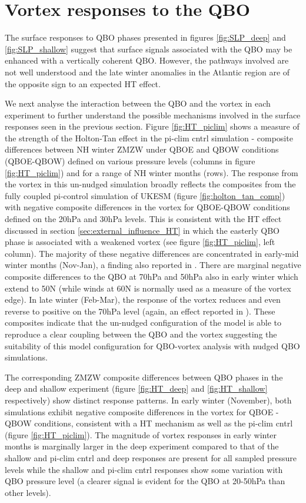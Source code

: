 \section{Vortex responses to the QBO}
The surface responses to QBO phases presented in figures \ref{fig:SLP_deep} and \ref{fig:SLP_shallow} suggest that surface signals associated with the QBO may be enhanced with a vertically coherent QBO. However, the pathways involved are not well understood and the late winter anomalies in the Atlantic region are of the opposite sign to an expected HT effect.

We next analyse the interaction between the QBO and the vortex in each experiment to further understand the possible mechanisms involved in the surface responses seen in the previous section. Figure \ref{fig:HT_piclim} shows a measure of the strength of the Holton-Tan effect in the pi-clim cntrl simulation -  composite differences between NH winter ZMZW under QBOE and QBOW conditions (QBOE-QBOW) defined on various pressure levels (columns in figure \ref{fig:HT_piclim}) and for a range of NH winter months (rows). The response from the vortex in this un-nudged simulation broadly reflects the composites from the fully coupled pi-control simulation of UKESM (figure \ref{fig:holton_tan_comp}) with negative composite differences in the vortex for QBOE-QBOW conditions defined on the 20hPa and 30hPa levels. This is consistent with the HT effect discussed in section \ref{sec:external_influence_HT} in which the easterly QBO phase is associated with a weakened vortex (see figure \ref{fig:HT_piclim}, left column). The majority of these negative differences are concentrated in early-mid winter months (Nov-Jan), a finding also reported in \cite{graySurface2018b}. There are marginal negative composite differences to the QBO at 70hPa and 50hPa also in early winter which extend to 50N (while winds at 60N is normally used as a measure of the vortex edge). In late winter (Feb-Mar), the response of the vortex reduces and even reverse to positive on the 70hPa level (again, an effect reported in \cite{graySurface2018b}). These composites indicate that the un-nudged configuration of the model is able to reproduce a clear coupling between the QBO and the vortex suggesting the suitability of this model configuration for QBO-vortex analysis with nudged QBO simulations.

The corresponding ZMZW composite differences between QBO phases in the deep and shallow experiment (figure \ref{fig:HT_deep} and \ref{fig:HT_shallow} respectively) show distinct response patterns. In early winter (November), both simulations exhibit negative composite differences in the vortex for QBOE - QBOW conditions, consistent with a HT mechanism \citep{holtonNumerical1980} as well as the pi-clim cntrl (figure \ref{fig:HT_piclim}). The magnitude of vortex responses in early winter months is marginally larger in the deep experiment compared to that of the shallow and pi-clim cntrl and deep responses are present for all sampled pressure levels while the shallow and pi-clim cntrl responses show some variation with QBO pressure level (a clearer signal is evident for the QBO at 20-50hPa than other levels). 

